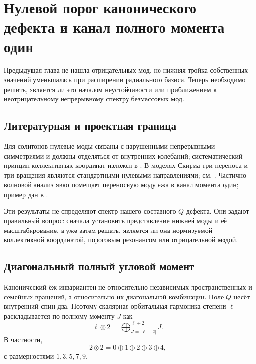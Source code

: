 \chapter{Нулевой порог канонического дефекта и канал полного момента один}

Предыдущая глава не нашла отрицательных мод, но нижняя тройка собственных
значений уменьшалась при расширении радиального базиса. Теперь необходимо
решить, является ли это началом неустойчивости или приближением к
неотрицательному непрерывному спектру безмассовых мод.

\section{Литературная и проектная граница}

Для солитонов нулевые моды связаны с нарушенными непрерывными симметриями и
должны отделяться от внутренних колебаний; систематический принцип
коллективных координат изложен в . В моделях Скирма
три переноса и три вращения являются стандартными нулевыми направлениями;
см. . Частично-волновой анализ явно помещает
переносную моду ежа в канал момента один; пример дан в
.

Эти результаты не определяют спектр нашего составного $Q$-дефекта. Они
задают правильный вопрос: сначала установить представление нижней моды и
её масштабирование, а уже затем решать, является ли она нормируемой
коллективной координатой, пороговым резонансом или отрицательной модой.

\section{Диагональный полный угловой момент}

Канонический ёж инвариантен не относительно независимых пространственных и
семейных вращений, а относительно их диагональной комбинации. Поле $Q$
несёт внутренний спин два. Поэтому скалярная орбитальная гармоника степени
$\ell$ раскладывается по полному моменту $J$ как
\begin{equation}
 \ell\otimes2
 =\bigoplus_{J=|\ell-2|}^{\ell+2}J.
 \label{eq:v6-grand-angular-momentum-decomposition}
\end{equation}
В частности,
\begin{equation}
 2\otimes2=0\oplus1\oplus2\oplus3\oplus4,
\end{equation}
с размерностями $1,3,5,7,9$.

